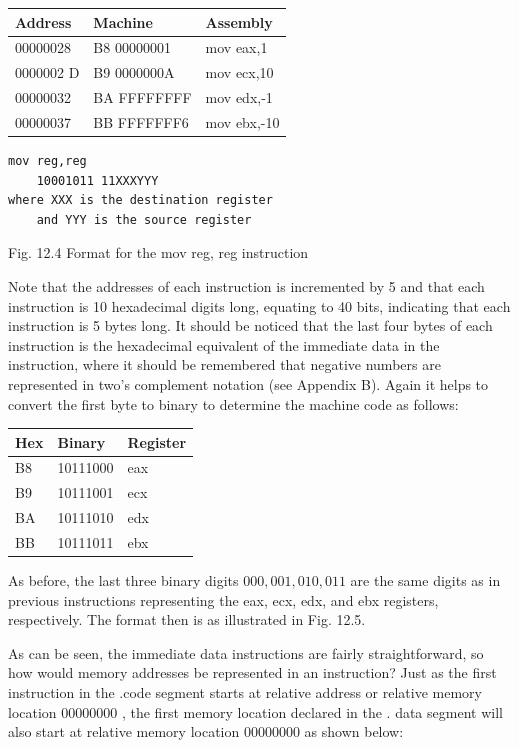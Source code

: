 \documentclass[10pt]{book}
\begin{document}
\begin{center}
\begin{center}
\begin{center}
\begin{center}
\begin{center}
\begin{center}
\begin{tabular}{|l|l|l|}
\hline
Address & Machine & Assembly \\
\hline
00000028 & B8 00000001 & mov eax,1 \\
\hline
0000002 D & B9 0000000A & mov ecx,10 \\
\hline
00000032 & BA FFFFFFFF & mov edx,-1 \\
\hline
00000037 & BB FFFFFFF6 & mov ebx,-10 \\
\hline
\end{tabular}
\end{center}

\begin{verbatim}
mov reg,reg
    10001011 11XXXYYY
where XXX is the destination register
    and YYY is the source register
\end{verbatim}

Fig. 12.4 Format for the mov reg, reg instruction

Note that the addresses of each instruction is incremented by 5 and that each instruction is 10 hexadecimal digits long, equating to 40 bits, indicating that each instruction is 5 bytes long. It should be noticed that the last four bytes of each instruction is the hexadecimal equivalent of the immediate data in the instruction, where it should be remembered that negative numbers are represented in two's complement notation (see Appendix B). Again it helps to convert the first byte to binary to determine the machine code as follows:

\begin{center}
\begin{tabular}{|l|l|l|}
\hline
Hex & Binary & Register \\
\hline
B8 & 10111000 & eax \\
\hline
B9 & 10111001 & ecx \\
\hline
BA & 10111010 & edx \\
\hline
BB & 10111011 & ebx \\
\hline
\end{tabular}
\end{center}

As before, the last three binary digits $000,001,010,011$ are the same digits as in previous instructions representing the eax, ecx, edx, and ebx registers, respectively. The format then is as illustrated in Fig. 12.5.

As can be seen, the immediate data instructions are fairly straightforward, so how would memory addresses be represented in an instruction? Just as the first instruction in the .code segment starts at relative address or relative memory location 00000000 , the first memory location declared in the . data segment will also start at relative memory location 00000000 as shown below:


\end{center}
\end{center}
\end{center}
\end{center}
\end{center}
\end{document}
